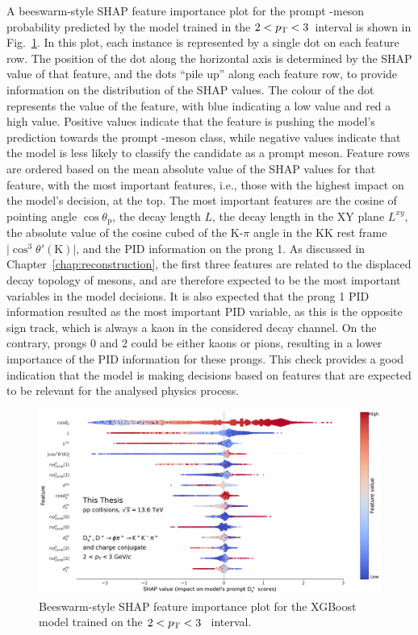 A beeswarm-style SHAP feature importance plot for the prompt \ds-meson probability predicted by the model trained in the $2<p_\mathrm{T}<3$~\gevc interval is shown in Fig.~\ref{fig:ml_feature_importance}. In this plot, each instance is represented by a single dot on each feature row. The position of the dot along the horizontal axis is determined by the SHAP value of that feature, and the dots ``pile up'' along each feature row, to provide information on the distribution of the SHAP values. The colour of the dot represents the value of the feature, with blue indicating a low value and red a high value. Positive values indicate that the feature is pushing the model's prediction towards the prompt \ds-meson class, while negative values indicate that the model is less likely to classify the candidate as a prompt \ds meson. Feature rows are ordered based on the mean absolute value of the SHAP values for that feature, with the most important features, i.e., those with the highest impact on the model's decision, at the top. The most important features are the cosine of pointing angle $\cos\theta_\mathrm{p}$, the decay length $L$, the decay length in the XY plane $L^{xy}$, the absolute value of the cosine cubed of the K-$\pi$ angle in the KK rest frame $\lvert\cos^3\theta'(\mathrm{K})\rvert$, and the PID information on the prong 1. As discussed in Chapter~\ref{chap:reconstruction}, the first three features are related to the displaced decay topology of \ds mesons, and are therefore expected to be the most important variables in the model decisions. It is also expected that the prong 1 PID information resulted as the most important PID variable, as this is the opposite sign track, which is always a kaon in the considered decay channel. On the contrary, prongs 0 and 2 could be either kaons or pions, resulting in a lower importance of the PID information for these prongs. This check provides a good indication that the model is making decisions based on features that are expected to be relevant for the analysed physics process. 

\begin{figure}[htb]
    \centering
    \includegraphics[width=\textwidth]{Figures/Chapter 5/shap.pdf}
    \caption{Beeswarm-style SHAP feature importance plot for the XGBoost model trained on the \mbox{$2<p_\mathrm{T}<3$~\gevc} interval.}
    \label{fig:ml_feature_importance}
\end{figure}

